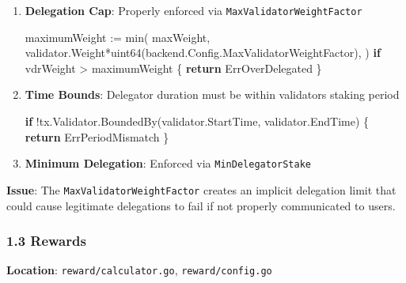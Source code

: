 \documentclass[
]{article}
\newenvironment{Shaded}{}{}
\newcommand{\ControlFlowTok}[1]{\textcolor[rgb]{0.00,0.44,0.13}{\textbf{#1}}}
\newcommand{\DataTypeTok}[1]{\textcolor[rgb]{0.56,0.13,0.00}{#1}}
\newcommand{\NormalTok}[1]{#1}
\newcommand{\OperatorTok}[1]{\textcolor[rgb]{0.40,0.40,0.40}{#1}}
\begin{document}
\begin{enumerate}
\def\labelenumi{\arabic{enumi}.}
\item
  \textbf{Delegation Cap}: Properly enforced via
  \texttt{MaxValidatorWeightFactor}

\begin{Shaded}
\begin{Highlighting}[]
\NormalTok{maximumWeight }\OperatorTok{:=}\NormalTok{ min}\OperatorTok{(}
\NormalTok{    maxWeight}\OperatorTok{,}
\NormalTok{    validator}\OperatorTok{.}\NormalTok{Weight}\OperatorTok{*}\DataTypeTok{uint64}\OperatorTok{(}\NormalTok{backend}\OperatorTok{.}\NormalTok{Config}\OperatorTok{.}\NormalTok{MaxValidatorWeightFactor}\OperatorTok{),}
\OperatorTok{)}
\ControlFlowTok{if}\NormalTok{ vdrWeight }\OperatorTok{\textgreater{}}\NormalTok{ maximumWeight }\OperatorTok{\{}
    \ControlFlowTok{return}\NormalTok{ ErrOverDelegated}
\OperatorTok{\}}
\end{Highlighting}
\end{Shaded}
\item
  \textbf{Time Bounds}: Delegator duration must be within
  validator\textquotesingle s staking period

\begin{Shaded}
\begin{Highlighting}[]
\ControlFlowTok{if} \OperatorTok{!}\NormalTok{tx}\OperatorTok{.}\NormalTok{Validator}\OperatorTok{.}\NormalTok{BoundedBy}\OperatorTok{(}\NormalTok{validator}\OperatorTok{.}\NormalTok{StartTime}\OperatorTok{,}\NormalTok{ validator}\OperatorTok{.}\NormalTok{EndTime}\OperatorTok{)} \OperatorTok{\{}
    \ControlFlowTok{return}\NormalTok{ ErrPeriodMismatch}
\OperatorTok{\}}
\end{Highlighting}
\end{Shaded}
\item
  \textbf{Minimum Delegation}: Enforced via \texttt{MinDelegatorStake}
\end{enumerate}

\textbf{Issue}: The \texttt{MaxValidatorWeightFactor} creates an
implicit delegation limit that could cause legitimate delegations to
fail if not properly communicated to users.

\subsubsection{1.3 Rewards}\label{13-rewards}

\textbf{Location}: \texttt{reward/calculator.go},
\texttt{reward/config.go}
\end{document}

